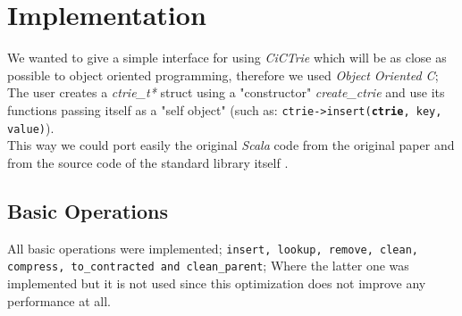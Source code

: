 \documentclass[conference]{IEEEtran}
\begin{document}
\section{Implementation}
	
	We wanted to give a simple interface for using \textit{CiCTrie}\cite{cictrie} which will be as close  as possible to object oriented programming, therefore we used \textit{Object Oriented C}; The user creates a \textit{ctrie\_t*} struct using a "constructor" \textit{create\_ctrie} and use its functions passing itself as a "self object" (such as: \texttt{ctrie->insert(\textbf{ctrie}, key, value)}). \\
	This way we could port easily the original \textit{Scala} code from the original paper \cite{article} and from the source code of the standard library itself \cite{ctrie-scala-source-code}. \\
	
\subsection{Basic Operations}
	All basic operations were implemented; \texttt{insert, lookup, remove, clean, compress, to\_contracted and clean\_parent}; Where the latter one was implemented but it is not used since this optimization does not improve any performance at all.
	
\end{document}
